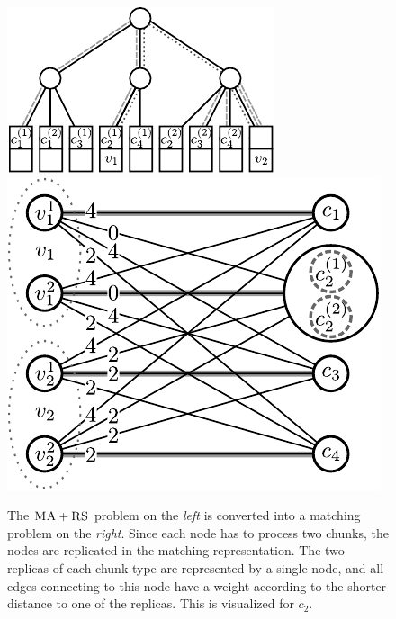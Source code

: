 \documentclass[9pt]{sigcomm-alternate}
\newcommand{\achunk}{\ensuremath{c}}
\newcommand{\RS}{\textsc{RS}}
\newcommand{\MA}{\textsc{MA}}
\begin{document}
\begin{figure}
\includegraphics[width = 0.49\columnwidth]{figs/model_ma_r_cv_boxes}
\hfill
\includegraphics[width =0.49\columnwidth]{figs/matching}
\caption{The $\MA+\RS$ problem on the \emph{left} is converted into a
matching problem on the \emph{right}. Since each node has to process two
chunks, the
nodes are replicated in the matching representation. The two replicas of each
chunk type are represented by a single node, and all edges connecting to this
node have a weight according to the shorter distance to one of the replicas.
This is visualized for $\achunk_2$.}
\label{fig:matching}
\end{figure}
\end{document}
